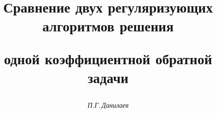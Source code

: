 

 


% 


\newcommand{\up}[2]{\overset{#1}{#2}{}} 


\newcommand{\const}{\operatorname{const}} 


\newcommand{\tts}[1]{} 


 




 


\setcounter{page}{3} 












 


\author{\it П.Г.\,Данилаев} 




\title{Сравнение двух регуляризующих алгоритмов решения 


одной коэффициентной обратной задачи} 


 


\date{} 




\pagestyle{plain} %


 




\maketitle 



